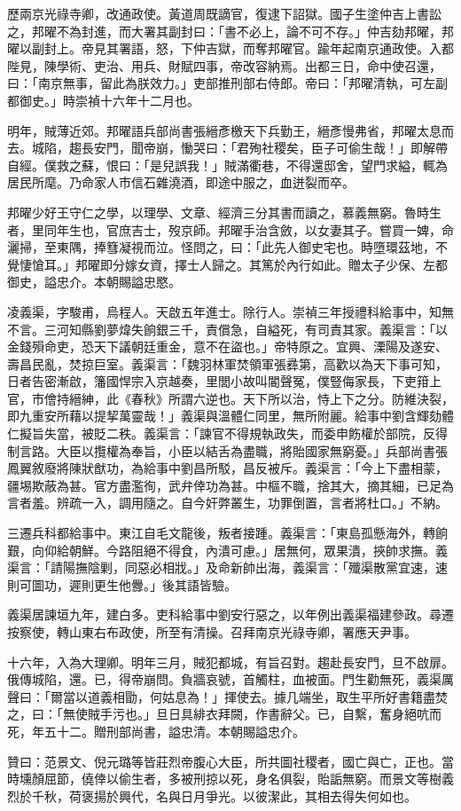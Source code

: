 \begin{pinyinscope}
歷兩京光祿寺卿，改通政使。黃道周既謫官，復逮下詔獄。國子生塗仲吉上書訟之，邦曜不為封進，而大署其副封曰：「書不必上，論不可不存。」仲吉劾邦曜，邦曜以副封上。帝見其署語，怒，下仲吉獄，而奪邦曜官。踰年起南京通政使。入都陛見，陳學術、吏治、用兵、財賦四事，帝改容納焉。出都三日，命中使召還，曰：「南京無事，留此為朕效力。」吏部推刑部右侍郎。帝曰：「邦曜清執，可左副都御史。」時崇禎十六年十二月也。

明年，賊薄近郊。邦曜語兵部尚書張縉彥檄天下兵勤王，縉彥慢弗省，邦曜太息而去。城陷，趨長安門，聞帝崩，慟哭曰：「君殉社稷矣，臣子可偷生哉！」即解帶自經。僕救之蘇，恨曰：「是兒誤我！」賊滿衢巷，不得還邸舍，望門求縊，輒為居民所麾。乃命家人市信石雜澆酒，即途中服之，血迸裂而卒。

邦曜少好王守仁之學，以理學、文章、經濟三分其書而讀之，慕義無窮。魯時生者，里同年生也，官庶吉士，歿京師。邦曜手治含斂，以女妻其子。嘗買一婢，命灑掃，至東隅，捧篲凝視而泣。怪問之，曰：「此先人御史宅也。時墮環茲地，不覺悽愴耳。」邦曜即分嫁女資，擇士人歸之。其篤於內行如此。贈太子少保、左都御史，謚忠介。本朝賜謚忠愍。

凌義渠，字駿甫，烏程人。天啟五年進士。除行人。崇禎三年授禮科給事中，知無不言。三河知縣劉夢煒失餉銀三千，責償急，自縊死，有司責其家。義渠言：「以金錢殞命吏，恐天下議朝廷重金，意不在盜也。」帝特原之。宜興、溧陽及遂安、壽昌民亂，焚掠巨室。義渠言：「魏羽林軍焚領軍張彞第，高歡以為天下事可知，日者告密漸啟，籓國悍宗入京越奏，里閭小故叫閽聲冤，僕豎侮家長，下吏箝上官，市儈持縉紳，此《春秋》所謂六逆也。天下所以治，恃上下之分。防維決裂，即九重安所藉以提挈萬靈哉！」義渠與溫體仁同里，無所附麗。給事中劉含輝劾體仁擬旨失當，被貶二秩。義渠言：「諫官不得規執政失，而委申飭權於部院，反得制言路。大臣以攬權為奉旨，小臣以結舌為盡職，將貽國家無窮憂。」兵部尚書張鳳翼敘廢將陳狀猷功，為給事中劉昌所駁，昌反被斥。義渠言：「今上下盡相蒙，疆埸欺蔽為甚。官方盡濫徇，武弁倖功為甚。中樞不職，捨其大，摘其細，已足為言者羞。辨疏一入，調用隨之。自今奸弊叢生，功罪倒置，言者將杜口。」不納。

三遷兵科都給事中。東江自毛文龍後，叛者接踵。義渠言：「東島孤懸海外，轉餉艱，向仰給朝鮮。今路阻絕不得食，內潰可慮。」居無何，眾果潰，挾帥求撫。義渠言：「請陽撫陰剿，同惡必相戕。」及命新帥出海，義渠言：「殲渠散黨宜速，速則可圖功，遲則更生他釁。」後其語皆驗。

義渠居諫垣九年，建白多。吏科給事中劉安行惡之，以年例出義渠福建參政。尋遷按察使，轉山東右布政使，所至有清操。召拜南京光祿寺卿，署應天尹事。

十六年，入為大理卿。明年三月，賊犯都城，有旨召對。趨赴長安門，旦不啟扉。俄傳城陷，還。已，得帝崩問。負牆哀號，首觸柱，血被面。門生勸無死，義渠厲聲曰：「爾當以道義相勖，何姑息為！」揮使去。據几端坐，取生平所好書籍盡焚之，曰：「無使賊手污也。」旦日具緋衣拜闕，作書辭父。已，自繫，奮身絕吭而死，年五十二。贈刑部尚書，謚忠清。本朝賜謚忠介。

贊曰：范景文、倪元璐等皆莊烈帝腹心大臣，所共圖社稷者，國亡與亡，正也。當時壎顏屈節，僥倖以偷生者，多被刑掠以死，身名俱裂，貽詬無窮。而景文等樹義烈於千秋，荷褒揚於興代，名與日月爭光。以彼潔此，其相去得失何如也。


\end{pinyinscope}